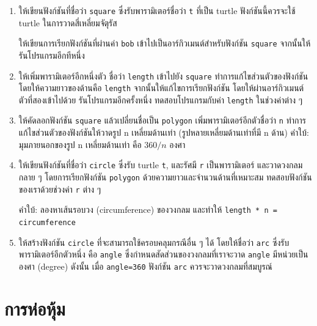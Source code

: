 \begin{enumerate}

\item ให้เขียนฟังก์ชันที่ชื่อว่า {\tt square} ซึ่งรับพารามิเตอร์ชื่อว่า {\tt t} ที่เป็น turtle 
ฟังก์ชันนี้ควรจะใช้ turtle ในการวาดสี่เหลี่ยมจัตุรัส

ให้เขียนการเรียกฟังก์ชันที่ผ่านค่า {\tt bob} เข้าไปเป็นอาร์กิวเมนต์สำหรับฟังก์ชัน {\tt square}
จากนั้นให้รันโปรแกรมอีกทีหนึ่ง

\item ให้เพิ่มพารามิเตอร์อีกหนึ่งตัว ชื่อว่า {\tt length} เข้าไปยัง {\tt square}
ทำการแก้ไขส่วนตัวของฟังก์ชันโดยให้ความยาวของด้านคือ {\tt length} จากนั้นให้แก้ไขการเรียกฟังก์ชัน
โดยให้ผ่านอาร์กิวเมนต์ตัวที่สองเข้าไปด้วย รันโปรแกรมอีกครั้งหนึ่ง ทดสอบโปรแกรมกับค่า {\tt length}
ในช่วงค่าต่าง ๆ

\item ให้คัดลอกฟังก์ชัน {\tt square} แล้วเปลี่ยนชื่อเป็น {\tt polygon}
เพิ่มพารามิเตอร์อีกตัวชื่อว่า {\tt n} ทำการแก้ไขส่วนตัวของฟังก์ชันให้วาดรูป n เหลี่ยมด้านเท่า 
(รูปหลายเหลี่ยมด้านเท่าที่มี n ด้าน)
คำใบ้: มุมภายนอกของรูป n เหลี่ยมด้านเท่า คือ {\scriptsize$360/n$} องศา  
 
 

\item ให้เขียนฟังก์ชันที่ชื่อว่า {\tt circle} ซึ่งรับ turtle {\tt t}, และรัศมี {\tt r} เป็นพารามิเตอร์
และวาดวงกลมกลาย ๆ โดยการเรียกฟังก์ชัน {\tt polygon} ด้วยความยาวและจำนวนด้านที่เหมาะสม
ทดสอบฟังก์ชันของเราด้วยช่วงค่า {\tt r} ต่าง ๆ
 
 

คำใบ้: ลองหาเส้นรอบวง (circumference) ของวงกลม และทำให้ {\tt length * n = circumference}

\item ให้สร้างฟังก์ชัน {\tt circle} ที่จะสามารถใช้ครอบคลุมกรณีอื่น ๆ ได้ โดยให้ชื่อว่า {\tt arc}
ซึ่งรับพารามิเตอร์อีกตัวหนึ่ง คือ {\tt angle} ซึ่งกำหนดสัดส่วนของวงกลมที่เราจะวาด
{\tt angle} มีหน่วยเป็นองศา (degree)  ดังนั้น เมื่อ {\tt angle=360} ฟังก์ชัน {\tt arc} 
ควรจะวาดวงกลมที่สมบูรณ์


\end{enumerate}


\section{การห่อหุ้ม} %

